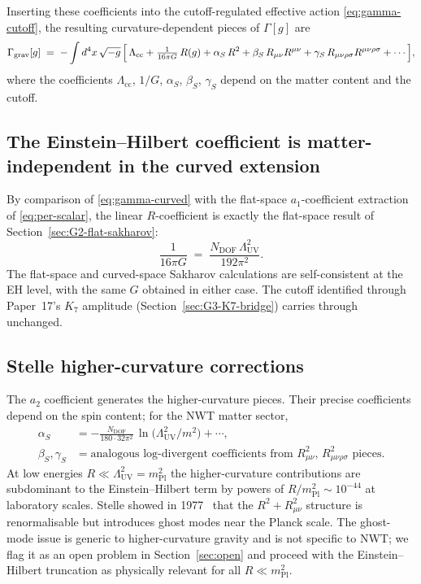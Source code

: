 \documentclass[11pt]{article}
\newcommand{\mPl}{m_{\mathrm{Pl}}}
\begin{document}
Inserting these coefficients into the cutoff-regulated effective
action \eqref{eq:gamma-cutoff}, the resulting curvature-dependent
pieces of $\Gamma[g]$ are
\begin{equation}
\Gamma_{\mathrm{grav}}[g]
   \;=\;
   -\int d^4 x\,\sqrt{-g}\,
   \Bigl[\,
       \Lambda_{\mathrm{cc}}
     + \tfrac{1}{16\pi G}\,R(g)
     + \alpha_S\,R^2
     + \beta_S\,R_{\mu\nu} R^{\mu\nu}
     + \gamma_S\,R_{\mu\nu\rho\sigma} R^{\mu\nu\rho\sigma}
     + \cdots
   \Bigr],
  \label{eq:gamma-curved}
\end{equation}
where the coefficients $\Lambda_{\mathrm{cc}}$, $1/G$,
$\alpha_S$, $\beta_S$, $\gamma_S$ depend on the matter content and
the cutoff.

\subsection{The Einstein--Hilbert coefficient is matter-independent
in the curved extension}

By comparison of \eqref{eq:gamma-curved} with the flat-space
$a_1$-coefficient extraction of \eqref{eq:per-scalar}, the linear
$R$-coefficient is exactly the flat-space result of
Section~\ref{sec:G2-flat-sakharov}:
\begin{equation}
  \frac{1}{16\pi G}
   \;=\;
   \frac{N_{\mathrm{DOF}}\,\Lambda_{\mathrm{UV}}^2}{192\pi^2}.
  \label{eq:G-curved}
\end{equation}
The flat-space and curved-space Sakharov calculations are
self-consistent at the EH level, with the same $G$ obtained in
either case.  The cutoff identified through Paper~17's $K_7$
amplitude (Section~\ref{sec:G3-K7-bridge}) carries through
unchanged.

\subsection{Stelle higher-curvature corrections}

The $a_2$ coefficient generates the higher-curvature pieces.
Their precise coefficients depend on the spin content; for the
NWT matter sector,
\begin{align}
  \alpha_S &= -\frac{N_{\mathrm{DOF}}}{180 \cdot 32\pi^2}\,
              \ln\!\bigl(\Lambda_{\mathrm{UV}}^2/m^2\bigr) + \cdots, \\
  \beta_S, \gamma_S &= \text{analogous log-divergent coefficients
                                 from $R_{\mu\nu}^2$, $R_{\mu\nu\rho\sigma}^2$ pieces}.
\end{align}
At low energies $R \ll \Lambda_{\mathrm{UV}}^2 = \mPl^2$ the
higher-curvature contributions are subdominant to the
Einstein--Hilbert term by powers of $R/\mPl^2 \sim 10^{-44}$ at
laboratory scales.  Stelle showed in 1977~\cite{stelle1977} that
the $R^2 + R_{\mu\nu}^2$ structure is renormalisable but introduces
ghost modes near the Planck scale.  The ghost-mode issue is
generic to higher-curvature gravity and is not specific to NWT;
we flag it as an open problem in Section~\ref{sec:open} and
proceed with the Einstein--Hilbert truncation as physically
relevant for all $R \ll \mPl^2$.
\end{document}
